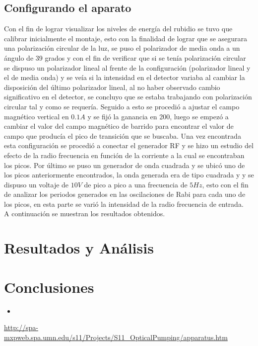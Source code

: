 \documentclass[%
 reprint,
 amsmath,amssymb,
 aps,
]{revtex4-1}
\begin{document}
\subsection{Configurando el aparato}
Con el fin de lograr visualizar los niveles de energía del rubidio se tuvo que calibrar inicialmente el montaje, esto con la finalidad de lograr que se asegurara una polarización circular de la luz, se puso el polarizador de media onda a un ángulo de 39 grados y con el fin de verificar que si se tenía polarización circular se dispuso un polarizador lineal al frente de la configuración (polarizador lineal y el de media onda) y se veía si la intensidad en el detector variaba al cambiar la disposición del último polarizador lineal, al no haber observado cambio significativo en el detector, se concluyo que se estaba trabajando con polarización circular tal y como se requería. Seguido a esto se procedió a ajustar el campo magnético vertical en $0.1A$ y se fijó la ganancia en 200, luego se empezó a cambiar el valor del campo magnético de barrido para encontrar el valor de campo que producía el pico de transición que se buscaba. Una vez encontrada esta configuración se procedió a conectar el generador RF y se hizo un estudio del efecto de la radio frecuencia en función de la corriente a la cual se encontraban los picos. Por último se puso un generador de onda cuadrada y se ubicó uno de los picos anteriormente encontrados, la onda generada era de tipo cuadrada y y se dispuso un voltaje de $10V$ de pico a pico a una frecuencia de $5Hz$, esto con el fin de analizar los periodos generados en las oscilaciones de Rabi para cada uno de los picos, en esta parte se varió la intensidad de la radio frecuencia de entrada.\\
A continuación se muestran los resultados obtenidos.


\section{Resultados y Análisis}



\section{Conclusiones}
\begin{itemize}
    \item 
\end{itemize}

\begin{thebibliography}{9}
\url{http://spa-mxpweb.spa.umn.edu/s11/Projects/S11_OpticalPumping/apparatus.htm}

\end{thebibliography}
\end{document}
